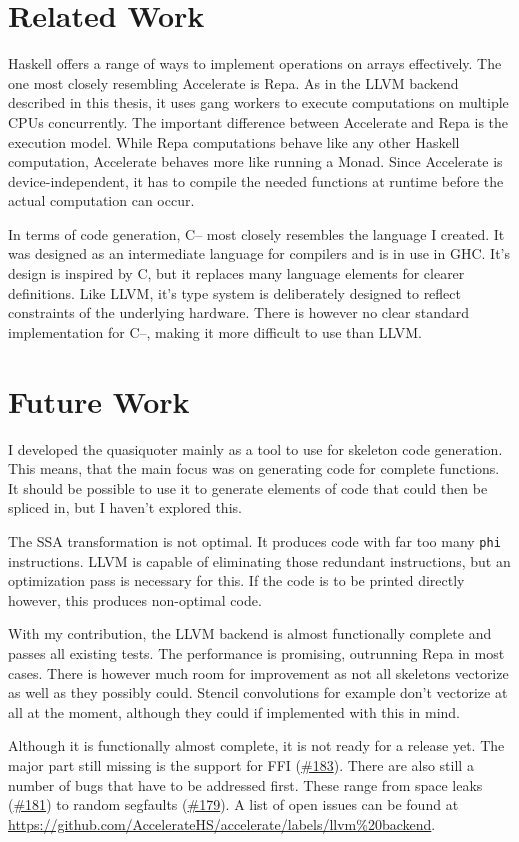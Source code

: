 \documentclass[a4paper,bibliography=totocnumbered,parskip,headsepline]{scrbook}
\begin{document}
\section{Related Work}
Haskell offers a range of ways to implement operations on arrays effectively.
The one most closely resembling Accelerate is Repa.
As in the LLVM backend described in this thesis, it uses gang workers to execute computations on multiple CPUs concurrently.
The important difference between Accelerate and Repa is the execution model.
While Repa computations behave like any other Haskell computation, Accelerate behaves more like running a Monad.
Since Accelerate is device-independent, it has to compile the needed functions at runtime before the actual computation can occur.

In terms of code generation, C-- most closely resembles the language I created.
It was designed as an intermediate language for compilers and is in use in GHC.
It's design is inspired by C, but it replaces many language elements for clearer definitions.
Like LLVM, it's type system is deliberately designed to reflect constraints of the underlying hardware.
There is however no clear standard implementation for C--, making it more difficult to use than LLVM.

\section{Future Work}
I developed the quasiquoter mainly as a tool to use for skeleton code generation.
This means, that the main focus was on generating code for complete functions.
It should be possible to use it to generate elements of code that could then be spliced in, but I haven't explored this.

The SSA transformation is not optimal.
It produces code with far too many \lstinline!phi! instructions.
LLVM is capable of eliminating those redundant instructions, but an optimization pass is necessary for this.
If the code is to be printed directly however, this produces non-optimal code.

With my contribution, the LLVM backend is almost functionally complete and passes all existing tests.
The performance is promising, outrunning Repa in most cases.
There is however much room for improvement as not all skeletons vectorize as well as they possibly could.
Stencil convolutions for example don't vectorize at all at the moment, although they could if implemented with this in mind.

Although it is functionally almost complete, it is not ready for a release yet.
The major part still missing is the support for FFI (\href{https://github.com/AccelerateHS/accelerate/issues/183}{\#183}).
There are also still a number of bugs that have to be addressed first.
These range from space leaks (\href{https://github.com/AccelerateHS/accelerate/issues/181}{\#181}) to random segfaults (\href{https://github.com/AccelerateHS/accelerate/issues/179}{\#179}).
A list of open issues can be found at \url{https://github.com/AccelerateHS/accelerate/labels/llvm%20backend}.


\appendix

\backmatter
\sloppy
\printbibliography[heading=bibintoc]
\end{document}
